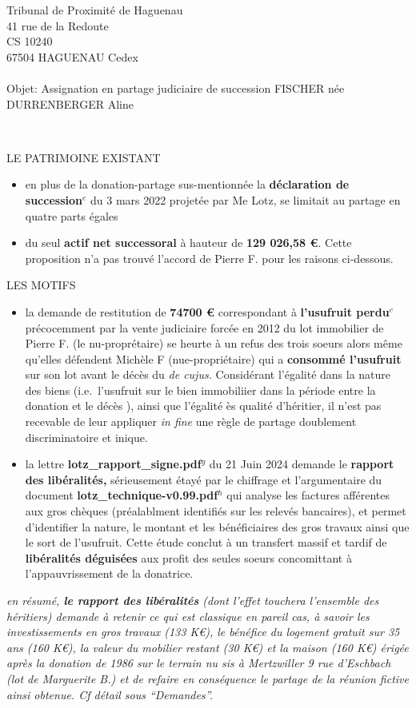 \documentclass[
]{letter}
\begin{document}
\begin{letter}{Tribunal de Proximité de Haguenau\\41 rue de la
Redoute\\CS 10240\\67504 HAGUENAU Cedex\\ ~ \\Objet: Assignation en
partage judiciaire de succession FISCHER née DURRENBERGER Aline}
\begin{itemize}
  ~\\
\end{itemize}

LE PATRIMOINE EXISTANT

\begin{itemize}
\item
  en plus de la donation-partage sus-mentionnée la \textbf{déclaration
  de succession}\(^e\) du 3 mars 2022 projetée par Me Lotz, se limitait
  au partage en quatre parts égales
\item
  du seul \textbf{actif net successoral} à hauteur de \textbf{129 026,58
  €}. Cette proposition n'a pas trouvé l'accord de Pierre F. pour les
  raisons ci-dessous.
\end{itemize}

LES MOTIFS

\begin{itemize}
\item
  la demande de restitution de \textbf{74700 €} correspondant à
  \textbf{l'usufruit perdu}\(^c\) précocemment par la vente judiciaire
  forcée en 2012 du lot immobilier de Pierre F. (le nu-proprétaire) se
  heurte à un refus des trois soeurs alors même qu'elles défendent
  Michèle F (nue-propriétaire) qui a \textbf{consommé l'usufruit} sur
  son lot avant le décès du \emph{de cujus.} Considérant l'égalité dans
  la nature des biens (i.e.~l'usufruit sur le bien immobiliier dans la
  période entre la donation et le décès ), ainsi que l'égalité ès
  qualité d'héritier, il n'est pas recevable de leur appliquer \emph{in
  fine} une règle de partage doublement discriminatoire et inique.
\item
  la lettre \textbf{lotz\_rapport\_signe.pdf}\(^g\) du 21 Juin 2024
  demande le \textbf{rapport des libéralités,} sérieusement étayé par le
  chiffrage et l'argumentaire du document
  \textbf{lotz\_technique-v0.99.pdf}\(^h\) qui analyse les factures
  afférentes aux gros chèques (préalablment identifiés sur les relevés
  bancaires), et permet d'identifier la nature, le montant et les
  bénéficiaires des gros travaux ainsi que le sort de l'usufruit. Cette
  étude conclut à un transfert massif et tardif de \textbf{libéralités
  déguisées} aux profit des seules soeurs concomittant à
  l'appauvrissement de la donatrice.
\end{itemize}

\emph{en résumé, \textbf{le rapport des libéralités} (dont l'effet
touchera l'ensemble des héritiers) demande à retenir ce qui est
classique en pareil cas, à savoir les investissements en gros travaux
(133 K€), le bénéfice du logement gratuit sur 35 ans (160 K€), la valeur
du mobilier restant (30 K€) et la maison (160 K€) érigée après la
donation de 1986 sur le terrain nu sis à Mertzwiller 9 rue d'Eschbach
(lot de Marguerite B.) et de refaire en conséquence le partage de la
réunion fictive ainsi obtenue. Cf détail sous ``Demandes''.}


\end{letter}
\end{document}
